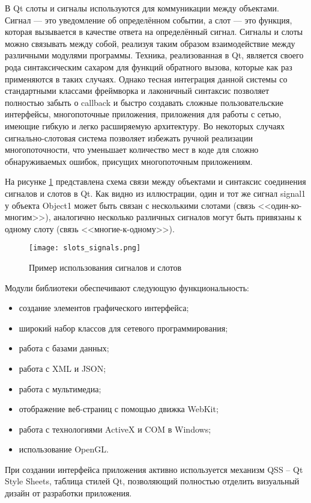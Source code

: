 В Qt слоты и сигналы используются для коммуникации между объектами. Сигнал ---
это уведомление об определённом событии, а слот --- это функция, которая
вызывается в качестве ответа на определённый сигнал. Сигналы и слоты можно
связывать между собой, реализуя таким образом взаимодействие между различными
модулями программы. Техника, реализованная в Qt, является своего рода
синтаксическим сахаром для функций обратного вызова, которые как раз применяются
в таких случаях. Однако тесная интеграция данной системы со стандартными
классами фреймворка и лаконичный синтаксис позволяет полностью забыть о callback
и быстро создавать сложные пользовательские интерфейсы, многопоточные приложения,
приложения для работы с сетью, имеющие гибкую и легко расширяемую архитектуру.
Во некоторых случаях сигнально-слотовая система позволяет избежать ручной
реализации многопоточности, что уменьшает количество мест в коде 
для сложно обнаруживаемых ошибок, присущих многопоточным приложениям.

На рисунке \ref{fig:slots_signals} представлена схема связи между объектами и
синтаксис соединения сигналов и слотов в Qt. Как видно из иллюстрации, один и
тот же сигнал signal1 у объекта Object1 может быть связан с несколькими слотами
(связь <<один-ко-многим>>), аналогично несколько различных сигналов могут быть
привязаны к одному слоту (связь <<многие-к-одному>>).

\begin{figure}[h!]
\centering
\texttt{[image: slots\_signals.png]}
\caption{Пример использования сигналов и слотов}
\label{fig:slots_signals}
\end{figure}

Модули библиотеки обеспечивают следующую функциональность:
\begin{itemize}
  \item создание элементов графического интерфейса;
  \item широкий набор классов для сетевого программирования;
  \item работа с базами данных;
  \item работа с XML и JSON;
  \item работа с мультимедиа;
  \item отображение веб-страниц с помощью движка WebKit;
  \item работа с технологиями ActiveX и COM в Windows;
  \item использование OpenGL. 
\end{itemize} 

При создании интерфейса приложения активно используется механизм QSS – Qt Style
Sheets, таблица стилей Qt, позволяющий полностью отделить визуальный дизайн от
разработки приложения.

